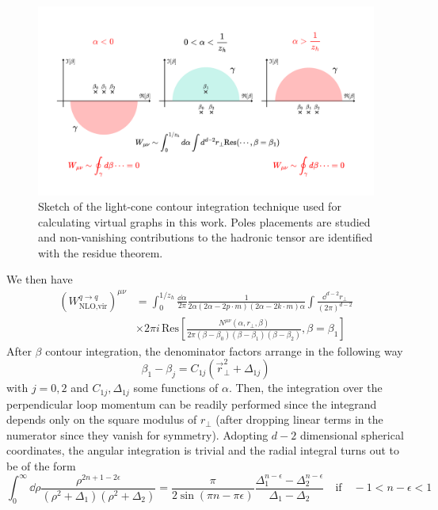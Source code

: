 \begin{figure}
    \centering
    \includegraphics[width=0.95\linewidth]{fig/beta contour.pdf}
    \caption{Sketch of the light-cone contour integration technique used for calculating virtual graphs in this work. Poles placements are studied and non-vanishing contributions to the hadronic tensor are identified with the residue theorem.}
    \label{fig:beta contour}
\end{figure}
We then have
\begin{equation}
\begin{aligned}
       (W^{q \to q}_{\text{NLO,vir}})^{\mu\nu} &=\int_0^{1/z_h}\frac{\dd \alpha}{2\pi} \frac{1}{2\alpha(2\alpha-2p \cdot m)(2\alpha-2 k \cdot m)\alpha}\int \frac{\dd^{d-2}r_\perp}{(2\pi)^{d-2}}\\
       &\times 2\pi i\,\mathrm{Res}\left[\frac{N^{\mu\nu}(\alpha,r_\perp,\beta)}{2\pi(\beta-\beta_0)(\beta-\beta_1)(\beta-\beta_2)},\beta=\beta_1\right]
\end{aligned}
\end{equation}
After $\beta$ contour integration, the denominator factors arrange in the following way
\begin{equation}\label{eq:betaimbetaj=C(rt2+Del)}
    \beta_1-\beta_j=C_{1j}(\vec r_\perp^2+\Delta_{1j})
\end{equation}
with $j=0,2$ and $C_{1j},\Delta_{1j}$ some functions of $\alpha$. Then, the integration over the perpendicular loop momentum can be readily performed since the integrand depends only on the square modulus of $r_\perp$ (after dropping linear terms in the numerator since they vanish for symmetry). Adopting $d-2$ dimensional spherical coordinates, the angular integration is trivial and the radial integral turns out to be of the form
\begin{equation}
    \int_0^\infty \dd \rho \frac{ \rho^{2n+1-2\epsilon}}{(\rho^2+\Delta_1)(\rho^2+\Delta_2)}=\frac{\pi}{2\sin(\pi n-\pi\epsilon)}\frac{\Delta_1^{n-\epsilon}-\Delta_2^{n-\epsilon}}{\Delta_1-\Delta_2}\quad \text{if} \quad -1<n-\epsilon<1
\end{equation}
